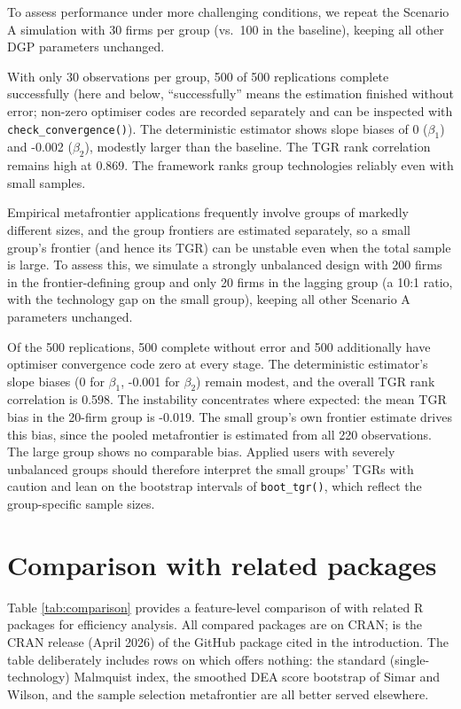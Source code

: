 To assess performance under more challenging conditions, we repeat the
Scenario A simulation with 30 firms per group (vs.~100 in the baseline),
keeping all other DGP parameters unchanged.

With only 30 observations per group, 500 of 500 replications
complete successfully (here and below, ``successfully'' means the estimation
finished without error; non-zero optimiser codes are recorded separately
and can be inspected with \texttt{check\_convergence()}). The deterministic
estimator shows slope biases of
0 (\(\beta_1\)) and
-0.002 (\(\beta_2\)), modestly larger than the
baseline. The TGR rank correlation remains high at
0.869. The framework ranks group technologies
reliably even with small samples.

Empirical metafrontier applications frequently involve groups of markedly
different sizes, and the group frontiers are estimated separately, so a
small group's frontier (and hence its TGR) can be unstable even when the
total sample is large. To assess this, we simulate a strongly unbalanced
design with 200 firms in the frontier-defining group and only 20 firms in
the lagging group (a 10:1 ratio, with the technology gap on the small
group), keeping all other Scenario A parameters unchanged.

Of the 500 replications, 500 complete without error and
500 additionally have optimiser convergence code zero at every
stage. The deterministic estimator's slope biases
(0 for \(\beta_1\), -0.001 for
\(\beta_2\)) remain modest, and the overall TGR rank correlation is
0.598. The instability concentrates where expected: the
mean TGR bias in the 20-firm group is -0.019.
The small group's own frontier estimate drives this bias, since the pooled
metafrontier is estimated from all 220 observations. The large group shows no comparable bias.
Applied users with severely unbalanced groups should therefore interpret
the small groups' TGRs with caution and lean on the bootstrap intervals of
\texttt{boot\_tgr()}, which reflect the group-specific sample sizes.

\section{Comparison with related packages}\label{sec:comparison}

Table \ref{tab:comparison} provides a feature-level comparison of
 with related \textsf{R} packages for efficiency
analysis. All compared packages are on CRAN;  is the CRAN
release (April 2026) of the GitHub package  cited in the
introduction. The table deliberately includes rows on which
 offers nothing: the standard (single-technology)
Malmquist index, the smoothed DEA score bootstrap of Simar and Wilson, and
the sample selection metafrontier are all better served elsewhere.

